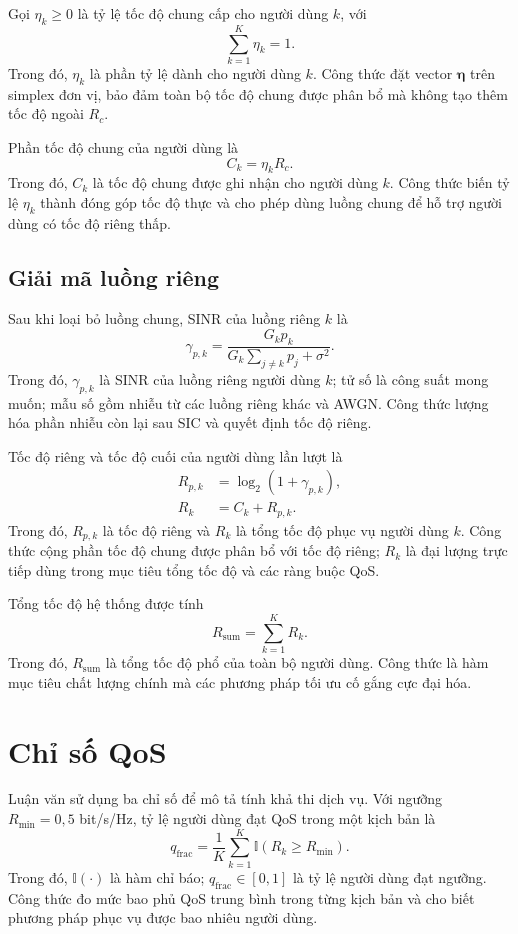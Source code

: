 Gọi $\eta_k\ge0$ là tỷ lệ tốc độ chung cấp cho người dùng $k$, với
\begin{equation}
 \sum_{k=1}^{K}\eta_k=1.
 \label{eq:common-simplex-ch2}
\end{equation}
Trong đó, $\eta_k$ là phần tỷ lệ dành cho người dùng $k$. Công thức đặt vector $\bm\eta$ trên simplex đơn vị, bảo đảm toàn bộ tốc độ chung được phân bổ mà không tạo thêm tốc độ ngoài $R_c$.

Phần tốc độ chung của người dùng là
\begin{equation}
 C_k=\eta_kR_c.
\end{equation}
Trong đó, $C_k$ là tốc độ chung được ghi nhận cho người dùng $k$. Công thức biến tỷ lệ $\eta_k$ thành đóng góp tốc độ thực và cho phép dùng luồng chung để hỗ trợ người dùng có tốc độ riêng thấp.


\subsection{Giải mã luồng riêng}
Sau khi loại bỏ luồng chung, SINR của luồng riêng $k$ là
\begin{equation}
 \gamma_{p,k}=\frac{G_kp_k}{G_k\sum_{j\ne k}p_j+\sigma^2}.
 \label{eq:private-sinr-ch2}
\end{equation}
Trong đó, $\gamma_{p,k}$ là SINR của luồng riêng người dùng $k$; tử số là công suất mong muốn; mẫu số gồm nhiễu từ các luồng riêng khác và AWGN. Công thức lượng hóa phần nhiễu còn lại sau SIC và quyết định tốc độ riêng.

Tốc độ riêng và tốc độ cuối của người dùng lần lượt là
\begin{align}
 R_{p,k}&=\log_2(1+\gamma_{p,k}),\\
 R_k&=C_k+R_{p,k}.
 \label{eq:user-rate-ch2}
\end{align}
Trong đó, $R_{p,k}$ là tốc độ riêng và $R_k$ là tổng tốc độ phục vụ người dùng $k$. Công thức cộng phần tốc độ chung được phân bổ với tốc độ riêng; $R_k$ là đại lượng trực tiếp dùng trong mục tiêu tổng tốc độ và các ràng buộc QoS.

Tổng tốc độ hệ thống được tính
\begin{equation}
 R_{\mathrm{sum}}=\sum_{k=1}^{K}R_k.
 \label{eq:sum-rate-ch2}
\end{equation}
Trong đó, $R_{\mathrm{sum}}$ là tổng tốc độ phổ của toàn bộ người dùng. Công thức là hàm mục tiêu chất lượng chính mà các phương pháp tối ưu cố gắng cực đại hóa.


\section{Chỉ số QoS}
Luận văn sử dụng ba chỉ số để mô tả tính khả thi dịch vụ. Với ngưỡng $R_{\min}=0{,}5$ bit/s/Hz, tỷ lệ người dùng đạt QoS trong một kịch bản là
\begin{equation}
 q_{\mathrm{frac}}=\frac{1}{K}\sum_{k=1}^{K}\mathbb{I}(R_k\ge R_{\min}).
 \label{eq:qos-fraction-ch2}
\end{equation}
Trong đó, $\mathbb{I}(\cdot)$ là hàm chỉ báo; $q_{\mathrm{frac}}\in[0,1]$ là tỷ lệ người dùng đạt ngưỡng. Công thức đo mức bao phủ QoS trung bình trong từng kịch bản và cho biết phương pháp phục vụ được bao nhiêu người dùng.

